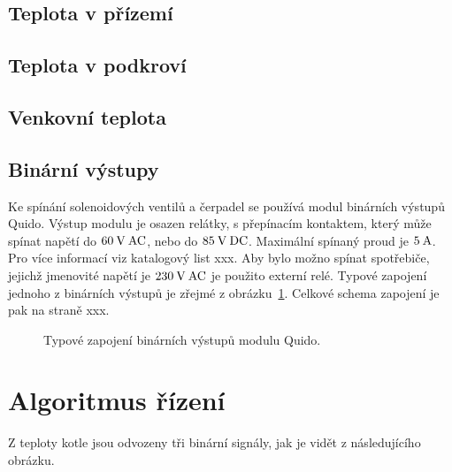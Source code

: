 \documentclass[a4paper,draft]{book}
\begin{document}
        \begin{tikzpicture}[scale=1.0]
        \end{tikzpicture}

    \section{Teplota v přízemí}

    \section{Teplota v podkroví}

    \section{Venkovní teplota}

    \section{Binární výstupy}

        Ke spínání solenoidových ventilů a čerpadel se používá modul binárních
        výstupů Quido. Výstup modulu je
        osazen relátky, s přepínacím kontaktem, který může spínat napětí do
        $60\rm\:V\:AC$, nebo do $85\rm\:V\:DC$. Maximální spínaný proud je
        $5\rm\:A$. Pro více informací viz katalogový list xxx. Aby bylo možno
        spínat spotřebiče, jejichž jmenovité napětí je $230\rm\:V\:AC$ je
        použito externí relé. Typové zapojení jednoho z binárních výstupů je
        zřejmé z obrázku~\ref{fig:binary-out}. Celkové schema zapojení je pak
        na straně xxx.

        \begin{figure}\centering
            \begin{tikzpicture}
                
            \end{tikzpicture}
            \caption{Typové zapojení binárních výstupů modulu Quido.}
            \label{fig:binary-out}
        \end{figure}

        \cite{da2rs}

    \chapter{Algoritmus řízení}\label{chap:algorithm}

        Z teploty kotle jsou odvozeny tři binární signály, jak je vidět z
        následujícího obrázku.
\end{document}
